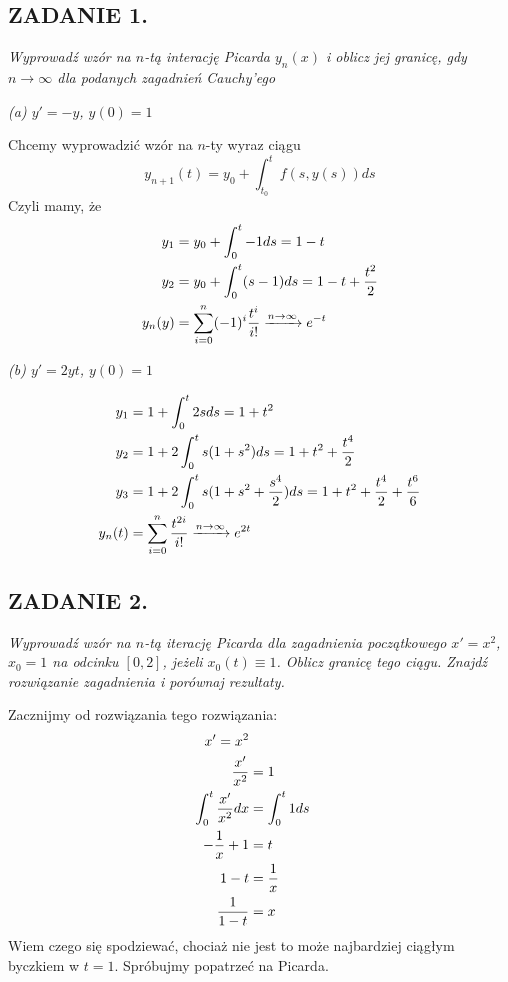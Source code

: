 \documentclass{article}
\begin{document}
\subsection*{ZADANIE 1.}
\emph{\color{purple}Wyprowadź wzór na $n$-tą interację Picarda $y_n(x)$ i oblicz jej granicę, gdy $n\to\infty$ dla podanych zagadnień Cauchy'ego}

\emph{\color{purple}(a) $y'=-y$, $y(0)=1$}

Chcemy wyprowadzić wzór na $n$-ty wyraz ciągu
$$y_{n+1}(t)=y_0+\int_{t_0}^tf(s, y(s))ds$$
Czyli mamy, że
\begin{align*}
    y_1&=y_0+\int_0^t-1ds=1-t\\
    y_2&=y_0+\int_0^t(s-1)ds=1-t+{t^2\over2}\\
    y_n(y)&=\sum\limits_{i=0}^n(-1)^i{t^i\over i!}\xrightarrow[]{n\to\infty}e^{-t}
\end{align*}

\emph{\color{purple}(b) $y'=2yt$, $y(0)=1$}

\begin{align*}
    y_1&=1+\int_0^t2sds=1+t^2\\
    y_2&=1+2\int_0^ts(1+s^2)ds=1+t^2+{t^4\over 2}\\
    y_3&=1+2\int_0^ts(1+s^2+{s^4\over2})ds=1+t^2+{t^4\over 2}+{t^6\over 6}\\
    y_n(t)&=\sum\limits_{i=0}^n{t^{2i}\over i!}\xrightarrow[]{n\to\infty}e^{2t}
\end{align*}

\subsection*{ZADANIE 2.}
\emph{\color{purple}Wyprowadź wzór na $n$-tą iterację Picarda dla zagadnienia początkowego $x'=x^2$, $x_0=1$ na odcinku $[0, 2]$, jeżeli $x_0(t)\equiv 1$. Oblicz granicę tego ciągu. Znajdź rozwiązanie zagadnienia i porównaj rezultaty.}

Zacznijmy od rozwiązania tego rozwiązania:
\begin{align*}
    x'=x^2\\
    {x'\over x^2}&=1\\
    \int_0^t{x'\over x^2}dx&=\int_0^t1ds\\
    -\frac1x+1&=t\\
    1-t&=\frac1x\\
    {1\over 1-t}&=x
\end{align*}
Wiem czego się spodziewać, chociaż nie jest to może najbardziej ciągłym byczkiem w $t=1$. Spróbujmy popatrzeć na Picarda.
\end{document}
